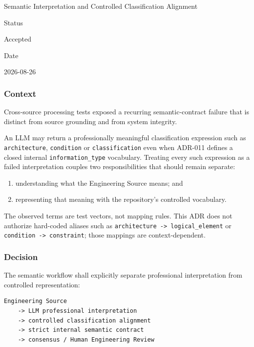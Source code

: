 Semantic Interpretation and Controlled Classification Alignment

Status

Accepted

Date

2026-08-26

\hypertarget{context-16}{%
\subsubsection{Context}\label{context-16}}

Cross-source processing tests exposed a recurring semantic-contract failure that is distinct from source grounding and from system integrity.

An LLM may return a professionally meaningful classification expression such as \texttt{architecture}, \texttt{condition} or \texttt{classification} even when ADR-011 defines a closed internal \texttt{information\_type} vocabulary. Treating every such expression as a failed interpretation couples two responsibilities that should remain separate:

\begin{enumerate}
\def\labelenumi{\arabic{enumi}.}
\tightlist
\item
  understanding what the Engineering Source means; and
\item
  representing that meaning with the repository's controlled vocabulary.
\end{enumerate}

The observed terms are test vectors, not mapping rules. This ADR does not authorize hard-coded aliases such as \texttt{architecture\ -\textgreater{}\ logical\_element} or \texttt{condition\ -\textgreater{}\ constraint}; those mappings are context-dependent.

\hypertarget{decision-16}{%
\subsubsection{Decision}\label{decision-16}}

The semantic workflow shall explicitly separate professional interpretation from controlled representation:

\begin{verbatim}
Engineering Source
    -> LLM professional interpretation
    -> controlled classification alignment
    -> strict internal semantic contract
    -> consensus / Human Engineering Review
\end{verbatim}

